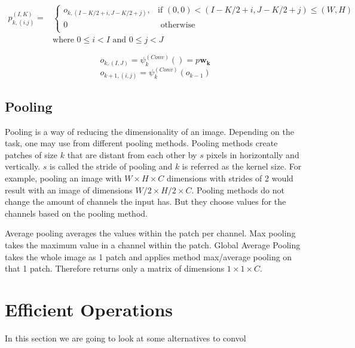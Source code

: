 \begin{equation}
\label{eq:convolution_patches}
\begin{split}
    p^{(I,K)}_{k,(i.j)} = &
\begin{cases}
    o_{k,(I-K/2+i, J-K/2+j)}, & \text{if } (0,0) < (I-K/2+i, J-K/2+j) \leq (W,H)\\
    0 &  \text{ otherwise }\\
\end{cases}\\ 
&\text{where } 0 \leq i < I \text{ and } 0 \leq j < J
\end{split}
\end{equation}

$$ o_{k, (I,J)} = \psi_k^{(Conv)}() =  p\mathbf{w_k}$$
$$ o_{k+1,(i,j)} = \psi^{(Conv)}_k(o_{k-1}) $$
\fi


\subsection{Pooling}
Pooling is a way of reducing the dimensionality of an image. Depending on the task, one may use from different pooling methods. Pooling methods create patches of size $k$ that are distant from each other by $s$ pixels in horizontally and vertically. $s$ is called the stride of pooling and $k$ is referred as the kernel size. For example, pooling an image with $W \times H \times C$ dimensions with strides of 2 would result with an image of dimensions $W/2 \times H/2 \times C$. Pooling methods do not change the amount of channels the input has. But they choose values for the channels based on the pooling method.

Average pooling averages the values within the patch per channel. Max pooling takes the maximum value in a channel within the patch. Global Average Pooling takes the whole image as 1 patch and applies method max/average pooling on that 1 patch. Therefore returns only a matrix of dimensions $1 \times 1 \times C$.

\section{Efficient Operations}
In this section we are going to look at some alternatives to convol

